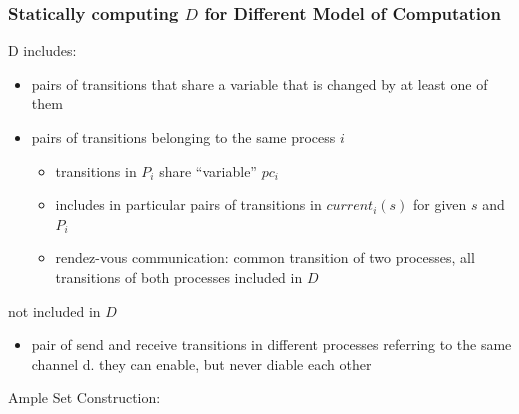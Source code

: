 \documentclass[a4paper, 10pt]{article}
\begin{document}
\subsubsection*{Statically computing $D$ for Different Model of Computation}
D includes:
\begin{itemize}
    \item pairs of transitions that share a variable that is changed by at least one of them
    \item pairs of transitions belonging to the same process $i$
    \begin{itemize}
        \item transitions in $P_i$ share ``variable'' $pc_i$
        \item includes in particular pairs of transitions in $current_i(s)$ for given $s$ and $P_i$
        \item rendez-vous communication: common transition of two processes, all transitions of both processes included in $D$
    \end{itemize}
\end{itemize}
not included in $D$
\begin{itemize}
    \item pair of send and receive transitions in different processes referring to the same channel d. {\tiny they can enable, but never diable each other}
\end{itemize}
Ample Set Construction:
\end{document}
